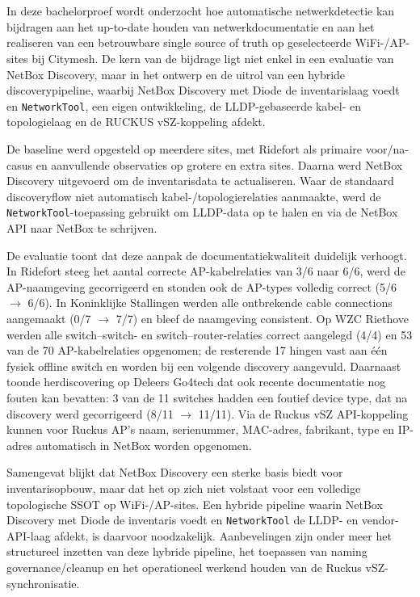 
\chapter*{}

\noindent In deze bachelorproef wordt onderzocht hoe automatische netwerkdetectie kan bijdragen aan het up-to-date houden van netwerkdocumentatie en aan het realiseren van een betrouwbare single source of truth op geselecteerde WiFi-/AP-sites bij Citymesh. De kern van de bijdrage ligt niet enkel in een evaluatie van NetBox Discovery, maar in het ontwerp en de uitrol van een hybride discoverypipeline, waarbij NetBox Discovery met Diode de inventarislaag voedt en \texttt{NetworkTool}, een eigen ontwikkeling, de LLDP-gebaseerde kabel- en topologielaag en de RUCKUS vSZ-koppeling afdekt.

\noindent De baseline werd opgesteld op meerdere sites, met Ridefort als primaire voor/na-casus en aanvullende observaties op grotere en extra sites. Daarna werd NetBox Discovery uitgevoerd om de inventarisdata te actualiseren. Waar de standaard discoveryflow niet automatisch kabel-/topologierelaties aanmaakte, werd de \texttt{NetworkTool}-toepassing gebruikt om LLDP-data op te halen en via de NetBox API naar NetBox te schrijven.

\noindent De evaluatie toont dat deze aanpak de documentatiekwaliteit duidelijk verhoogt. In Ridefort steeg het aantal correcte AP-kabelrelaties van 3/6 naar 6/6, werd de AP-naamgeving gecorrigeerd en stonden ook de AP-types volledig correct (5/6 $\rightarrow$ 6/6). In Koninklijke Stallingen werden alle ontbrekende cable connections aangemaakt (0/7 $\rightarrow$ 7/7) en bleef de naamgeving consistent. Op WZC Riethove werden alle switch--switch- en switch--router-relaties correct aangelegd (4/4) en 53 van de 70 AP-kabelrelaties opgenomen; de resterende 17 hingen vast aan één fysiek offline switch en worden bij een volgende discovery aangevuld. Daarnaast toonde herdiscovering op Deleers Go4tech dat ook recente documentatie nog fouten kan bevatten: 3 van de 11 switches hadden een foutief device type, dat na discovery werd gecorrigeerd (8/11 $\rightarrow$ 11/11). Via de Ruckus vSZ API-koppeling kunnen voor Ruckus AP's naam, serienummer, MAC-adres, fabrikant, type en IP-adres automatisch in NetBox worden opgenomen.

\noindent Samengevat blijkt dat NetBox Discovery een sterke basis biedt voor inventarisopbouw, maar dat het op zich niet volstaat voor een volledige topologische SSOT op WiFi-/AP-sites. Een hybride pipeline waarin NetBox Discovery met Diode de inventaris voedt en \texttt{NetworkTool} de LLDP- en vendor-API-laag afdekt, is daarvoor noodzakelijk. Aanbevelingen zijn onder meer het structureel inzetten van deze hybride pipeline, het toepassen van naming governance/cleanup en het operationeel werkend houden van de Ruckus vSZ-synchronisatie.
